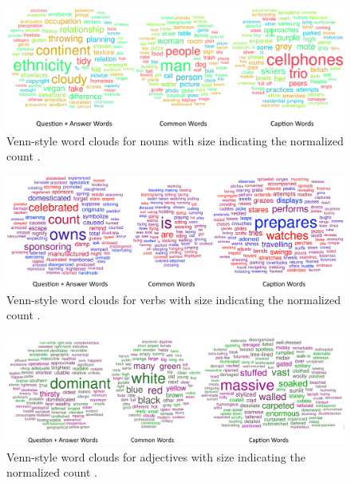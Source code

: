 
\begin{figure}
\centering
\includegraphics[width=0.9\linewidth]{figures/coco_nouns.png}
\caption{Venn-style word clouds \cite{CoppersmithKelly14} for nouns with size indicating the normalized count .}
\label{fig:noun_cloud_real}
\end{figure}

\begin{figure}
\centering
\includegraphics[width=0.9\linewidth]{figures/coco_verbs.png}
\caption{Venn-style word clouds \cite{CoppersmithKelly14} for verbs with size indicating the normalized count .}
\label{fig:verb_cloud_real}
\end{figure}

\begin{figure}
\centering
\includegraphics[width=0.9\linewidth]{figures/coco_adjectives.png}
\caption{Venn-style word clouds \cite{CoppersmithKelly14} for adjectives with size indicating the normalized count .}
\label{fig:adj_cloud_real}
\end{figure}
\clearpage

